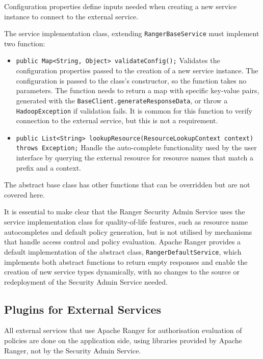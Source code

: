 Configuration properties define inputs needed when creating a new service instance to connect to the external service.

The service implementation class, extending \texttt{RangerBaseService} must implement two function:

\begin{itemize}
    \item \texttt{public Map<String, Object> validateConfig();} Validates the configuration properties passed to the creation of a new service instance. The configuration is passed to the class's constructor, so the function takes no parameters. The function needs to return a map with specific key-value pairs, generated with the \texttt{BaseClient.generateResponseData}, or throw a \texttt{HadoopException} if validation fails. It is common for this function to verify connection to the external service, but this is not a requirement.
    \item \texttt{public List<String> lookupResource(ResourceLookupContext context) throws Exception;} Handle the auto-complete functionality used by the user interface by querying the external resource for resource names that match a prefix and a context.  
\end{itemize}

The abstract base class has other functions that can be overridden but are not covered here. 

It is essential to make clear that the Ranger Security Admin Service uses the service implementation class for quality-of-life features, such as resource name autocompletes and default policy generation, but is not utilised by mechanisms that handle access control and policy evaluation. Apache Ranger provides a default implementation of the abstract class, \texttt{RangerDefaultService}, which implements both abstract functions to return empty responses and enable the creation of new service types dynamically, with no changes to the source or redeployment of the Security Admin Service needed.

\subsection{Plugins for External Services}

All external services that use Apache Ranger for authorisation evaluation of policies are done on the application side, using libraries provided by Apache Ranger, not by the Security Admin Service. 


